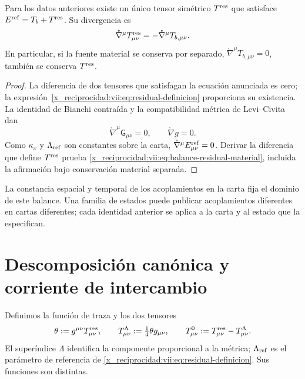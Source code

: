 \begin{theorem}
\label{x_reciprocidad:vii:thm:residual-unicidad-balance}
Para los datos anteriores existe un único tensor simétrico
\(T^{\rm res}\) que satisface
\(\mathcal E^{\rm ref}=T_b+T^{\rm res}\). Su divergencia es
\begin{equation}
 \mathring\nabla^\mu T^{\rm res}_{\mu\nu}
 =-\mathring\nabla^\mu T_{b,\mu\nu}.
 \label{x_reciprocidad:vii:eq:balance-residual-material}
\end{equation}
En particular, si la fuente material se conserva por separado,
\(\mathring\nabla^\mu T_{b,\mu\nu}=0\), también se conserva
\(T^{\rm res}\).
\end{theorem}
\begin{proof}
La diferencia de dos tensores que satisfagan la ecuación anunciada es
cero; la expresión~\eqref{x_reciprocidad:vii:eq:residual-definicion} proporciona su
existencia. La identidad de Bianchi contraída y la compatibilidad métrica
de Levi--Civita dan
\[
 \mathring\nabla^\mu\mathsf G_{\mu\nu}=0,
 \qquad \mathring\nabla g=0.
\]
Como \(\kappa_x\) y \(\Lambda_{\rm ref}\) son constantes sobre la
carta, \(\mathring\nabla^\mu\mathcal E^{\rm ref}_{\mu\nu}=0\).
Derivar la diferencia que define \(T^{\rm res}\) prueba
\eqref{x_reciprocidad:vii:eq:balance-residual-material}, incluida la afirmación bajo
conservación material separada.
\end{proof}

La constancia espacial y temporal de los acoplamientos en la carta fija
el dominio de este balance. Una familia de estados puede publicar
acoplamientos diferentes en cartas diferentes; cada identidad anterior
se aplica a la carta y al estado que la especifican.

\section{Descomposición canónica y corriente de intercambio}
\label{x_reciprocidad:vii:subsec:traza-corriente-residual}

Definimos la función de traza y los dos tensores
\begin{equation}
 \theta:=g^{\mu\nu}T^{\rm res}_{\mu\nu},\qquad
 T^{\Lambda}_{\mu\nu}:=\tfrac14\theta g_{\mu\nu},\qquad
 T^{0}_{\mu\nu}:=T^{\rm res}_{\mu\nu}-T^{\Lambda}_{\mu\nu}.
 \label{x_reciprocidad:vii:eq:descomposicion-traza-residual}
\end{equation}
El superíndice \(\Lambda\) identifica la componente proporcional a la
métrica; \(\Lambda_{\rm ref}\) es el parámetro de referencia de
\eqref{x_reciprocidad:vii:eq:residual-definicion}. Sus funciones son distintas.

